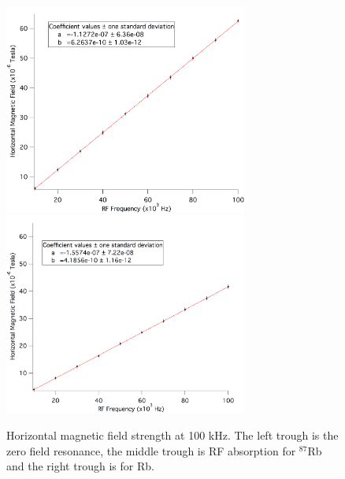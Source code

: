 \documentclass[prb,preprint]{revtex4-1}
\begin{document}
\begin{figure}[h]
\centering
\includegraphics[width=8cm]{85vsFreq.png}
\includegraphics[width=8cm]{87vsFreq.png}
\caption{Horizontal magnetic field strength at 100 kHz. The left trough is the zero field resonance, the middle trough is RF absorption for $^87$Rb and the right trough is for Rb.}
\label{exp}
\end{figure}

\end{document}
